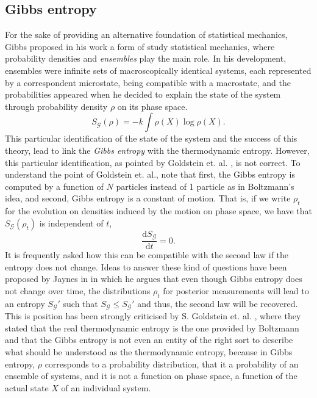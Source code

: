 \subsection{Gibbs entropy}
For the sake of providing an alternative foundation of statistical mechanics, Gibbs proposed in his work \cite{gibbs_elementary_1902} a form of study statistical mechanics, where probability densities and \textit{ensembles} play the main role. In his development, ensembles were infinite sets of macroscopically identical systems, each represented by a correspondent microstate, being compatible with a macrostate, and the probabilities appeared when he decided to explain the state of the system through probability density $\rho$ on its phase space.
\begin{equation}
S_{\mathcal{G}} (\rho) =-k \int \rho(X) \log\rho(X).
\label{CH1:gibbs_entropy}
\end{equation}
This particular identification of the state of the system and the success of this theory, lead to link the \textit{Gibbs entropy} with the thermodynamic entropy. However, this particular identification, as pointed by Goldstein et. al. \cite{goldstein_boltzmanns_2001, goldstein_gibbs_2020}, is not correct. To understand the point of Goldstein et. al., note that first, the Gibbs entropy is computed by a function of $N$ particles instead of 1 particle as in Boltzmann's idea, and second, Gibbs entropy is a constant of motion. That is, if we write $\rho_t$ for the evolution on densities induced by the motion on phase space, we have that $S_{\mathcal{G}} (\rho_t)$ is independent of $t$, 
\begin{equation}
\frac{\mathrm{d} S_{\mathcal{G}}}{\mathrm{d} t} =0.
\end{equation}
It is frequently asked how this can be compatible with the second law if the entropy does not change. Ideas to answer these kind of questions have been proposed by Jaynes in \cite{doi:10.1119/1.1971557} in which he argues that even though Gibbs entropy does not change over time, the distributions $\rho_t$ for posterior measurements will lead to an entropy $S_{\mathcal{G}}'$  such that $S_{\mathcal{G}}\leq S_{\mathcal{G}}'$ and thus, the second law will be recovered.
This is position has been strongly criticised by S. Goldstein et. al. \cite{goldstein_boltzmanns_2001, goldstein_gibbs_2020}, where they stated that the real thermodynamic entropy is the one provided by Boltzmann and that the Gibbs entropy is not even an entity of the right sort to describe what should be understood as the thermodynamic entropy, because in Gibbs entropy,  $\rho$ corresponds to a probability distribution, that it a probability of an ensemble of systems, and it is not a function on phase space, a function of the actual state $X$ of an individual system. \\
